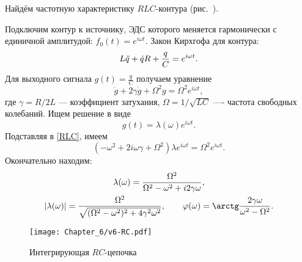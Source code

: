 \begin{lab:example}\label{example:RLC}
Найдём частотную характеристику $RLC$-контура (рис.~).

Подключим контур к источнику, ЭДС которого меняется гармонически 
с единичной амплитудой: $f_0(t)=e^{i\omega t}$.
Закон Кирхгофа для контура:
\begin{equation}
    \eqmark{RLC}
L\ddot{q} + \dot{q}R+\frac{q}{C}=e^{i\omega t}.
\end{equation}
Для выходного сигнала $g(t)=\frac{q}{C}$ получаем уравнение
\begin{equation*}
\ddot{g}+2\gamma\dot{g}+\Omega^2g=\Omega^2 e^{i\omega t},
\end{equation*}
где $\gamma = R/2L$ --- коэффициент затухания,
$\Omega = 1/\sqrt{LC}$ ---- частота свободных колебаний.
Ищем решение в виде
\begin{equation*}
g(t)=\lambda(\omega)e^{i\omega t}.
\end{equation*}
Подставляя в \eqref{RLC}, имеем
\begin{equation*}
    (-\omega^2 +2i\omega\gamma + \Omega^2) \lambda e^{i\omega t}=\Omega^2 e^{i\omega t}.
\end{equation*}
Окончательно находим:
\begin{equation}
    \eqmark{RLC-lambda}
\begin{gathered}
\lambda(\omega)=\frac{\Omega^2}{\Omega^2-\omega^2+i2\gamma\omega},\\
\left|\lambda(\omega)\right|=\frac{\Omega^2}{\sqrt{
(\Omega^2-\omega^2)^2+4\gamma^2\omega^2}},
\qquad \varphi(\omega)=\arctg\frac{2\gamma\omega}{\omega^2-\Omega^2}.
\end{gathered}
\end{equation}
\end{lab:example}

\begin{wrapfigure}[11]{o}{0.25\textwidth}
\centering\texttt{[image: Chapter\_6/v6-RC.pdf]}
\caption{\footnotesize Интегрирующая $RC$-цепочка}
\end{wrapfigure}

